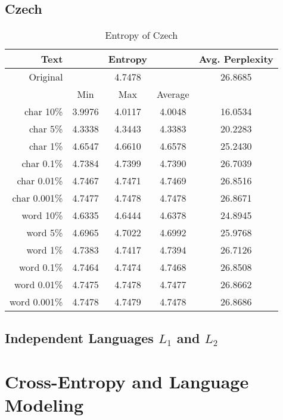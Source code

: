 \documentclass[a4paper]{article}
\begin{document}
\subsection{Czech}

\begin{table}[htpb]
    \centering
    \caption{Entropy of Czech\\}
    \label{tab:cz_entropy}
    \begin{tabular}{r|ccc|c}
        Text & & Entropy & & Avg. Perplexity \\
        \hline
        Original & &  4.7478 & & 26.8685 \\
        \hline
                 & Min & Max & Average & \\
        \hline
        char {10\%} & 3.9976 & 4.0117 & 4.0048 & 16.0534 \\
        char {5\%} & 4.3338 & 4.3443 & 4.3383 & 20.2283 \\
        char {1\%} & 4.6547 & 4.6610 & 4.6578 & 25.2430 \\
        char {0.1\%} & 4.7384 & 4.7399 & 4.7390 & 26.7039 \\
        char {0.01\%} & 4.7467 & 4.7471 & 4.7469 & 26.8516 \\
        char {0.001\%} & 4.7477 & 4.7478 & 4.7478 & 26.8671 \\
        \hline
        word {10\%} & 4.6335 & 4.6444 & 4.6378 & 24.8945 \\
        word {5\%} & 4.6965 & 4.7022 & 4.6992 & 25.9768 \\
        word {1\%} & 4.7383 & 4.7417 & 4.7394 & 26.7126 \\
        word {0.1\%} & 4.7464 & 4.7474 & 4.7468 & 26.8508 \\
        word {0.01\%} & 4.7475 & 4.7478 & 4.7477 & 26.8662 \\
        word {0.001\%} & 4.7478 & 4.7479 & 4.7478 & 26.8686 \\
    \end{tabular}
\end{table}

\subsection{Independent Languages $L_1$ and $L_2$}

\section{Cross-Entropy and Language Modeling}
\end{document}
